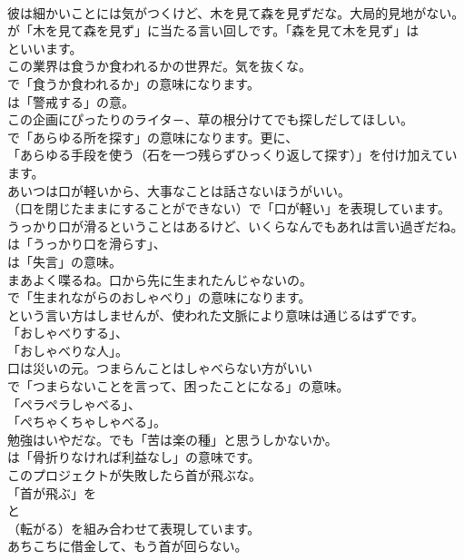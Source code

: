 \documentclass[8pt]{extreport}
\begin{document}
\begin{CJK}{UTF8}{min}
\\	彼は細かいことには気がつくけど、木を見て森を見ずだな。大局的見地がない。 
\\	が「木を見て森を見ず」に当たる言い回しです。「森を見て木を見ず」は 
\\	といいます。	
\\	この業界は食うか食われるかの世界だ。気を抜くな。 
\\	で「食うか食われるか」の意味になります。
\\	は「警戒する」の意。	
\\	この企画にぴったりのライタ－、草の根分けてでも探しだしてほしい。 
\\	で「あらゆる所を探す」の意味になります。更に、
\\	「あらゆる手段を使う（石を一つ残らずひっくり返して探す）」を付け加えています。	
\\	あいつは口が軽いから、大事なことは話さないほうがいい。 
\\	（口を閉じたままにすることができない）で「口が軽い」を表現しています。	
\\	うっかり口が滑るということはあるけど、いくらなんでもあれは言い過ぎだね。 
\\	は「うっかり口を滑らす」、
\\	は「失言」の意味。	
\\	まあよく喋るね。口から先に生まれたんじゃないの。 
\\	で「生まれながらのおしゃべり」の意味になります。
\\	という言い方はしませんが、使われた文脈により意味は通じるはずです。
\\	「おしゃべりする」、
\\	「おしゃべりな人」。	
\\	口は災いの元。つまらんことはしゃべらない方がいい 
\\	で「つまらないことを言って、困ったことになる」の意味。
\\	「ペラペラしゃべる」、
\\	「ぺちゃくちゃしゃべる」。	
\\	勉強はいやだな。でも「苦は楽の種」と思うしかないか。 
\\	は「骨折りなければ利益なし」の意味です。	
\\	このプロジェクトが失敗したら首が飛ぶな。 
\\	「首が飛ぶ」を 
\\	と 
\\	（転がる）を組み合わせて表現しています。	
\\	あちこちに借金して、もう首が回らない。 

\end{CJK}
\end{document}
